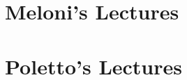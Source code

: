 \documentclass[11pt, a4paper, twoside, openright]{book}
\begin{document}
%
%
%
%
%
%






\mainmatter
\pagestyle{fancy}

\part{Meloni's Lectures}



 
 
 
 
 

\part{Poletto's Lectures}

 
 
 






\backmatter
\pagestyle{plain}



%
\end{document}
